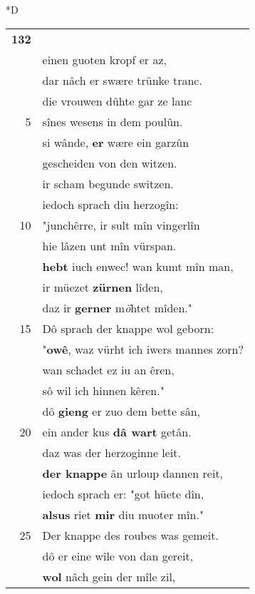 \documentclass[8pt,a4paper,notitlepage]{article}
\begin{document}
\begin{table}[ht]
\begin{minipage}[t]{0.5\linewidth}
\small
\begin{center}*D
\end{center}
\begin{tabular}{rl}
\textbf{132} & \textbf{\begin{large}E\end{large}rn ruochte}, wâ diu wirtîn saz.\\ 
 & einen guoten kropf er az,\\ 
 & dar nâch er swære trünke tranc.\\ 
 & die vrouwen dûhte gar ze lanc\\ 
5 & sînes wesens in dem poulûn.\\ 
 & si wânde, \textbf{er} wære ein garzûn\\ 
 & gescheiden von den witzen.\\ 
 & ir scham begunde switzen.\\ 
 & iedoch sprach diu herzogîn:\\ 
10 & "junchêrre, ir sult mîn vingerlîn\\ 
 & hie lâzen unt mîn vürspan.\\ 
 & \textbf{hebt} iuch enwec! wan kumt mîn man,\\ 
 & ir müezet \textbf{zürnen} lîden,\\ 
 & daz ir \textbf{gerner} m\textit{ö}htet mîden."\\ 
15 & Dô sprach der knappe wol geborn:\\ 
 & "\textbf{owê}, waz vürht ich iwers mannes zorn?\\ 
 & wan schadet ez iu an êren,\\ 
 & sô wil ich hinnen kêren."\\ 
 & dô \textbf{gieng} er zuo dem bette sân,\\ 
20 & ein ander kus \textbf{dâ wart} getân.\\ 
 & daz was der herzoginne leit.\\ 
 & \textbf{der knappe} ân urloup dannen reit,\\ 
 & iedoch sprach er: "got hüete dîn,\\ 
 & \textbf{alsus} riet \textbf{mir} diu muoter mîn."\\ 
25 & Der knappe des roubes was gemeit.\\ 
 & dô er eine wîle von dan gereit,\\ 
 & \textbf{wol} nâch gein der mîle zil,\\ 

\end{tabular}
\end{minipage}
\end{table}
\end{document}
